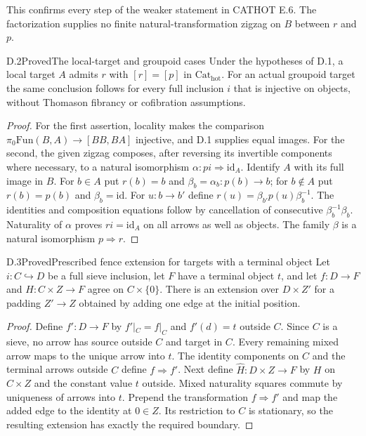 This confirms every step of the weaker statement in CATHOT E.6. The factorization supplies no finite natural-transformation zigzag on $B$ between $r$ and $p$.

\begin{claim}{D.2}{Proved}{The local-target and groupoid cases}
Under the hypotheses of D.1, a local target $A$ admits $r$ with $[r]=[p]$ in $\mathrm{Cat}_{\mathrm{hot}}$. For an actual groupoid target the same conclusion follows for every full inclusion $i$ that is injective on objects, without Thomason fibrancy or cofibration assumptions.
\end{claim}
\begin{proof}
For the first assertion, locality makes the comparison
$\pi_0\mathrm{Fun}(B,A)\to[BB,BA]$ injective, and D.1 supplies equal images.
For the second, the given zigzag composes, after reversing its invertible components where necessary, to a natural isomorphism $\alpha:pi\Rightarrow\mathrm{id}_A$. Identify $A$ with its full image in $B$. For $b\in A$ put $r(b)=b$ and $\beta_b=\alpha_b:p(b)\to b$; for $b\notin A$ put $r(b)=p(b)$ and $\beta_b=\mathrm{id}$. For $u:b\to b'$ define
$r(u)=\beta_{b'}p(u)\beta_b^{-1}$.
The identities and composition equations follow by cancellation of consecutive $\beta_b^{-1}\beta_b$. Naturality of $\alpha$ proves $ri=\mathrm{id}_A$ on all arrows as well as objects. The family $\beta$ is a natural isomorphism $p\Rightarrow r$.
\end{proof}

\begin{claim}{D.3}{Proved}{Prescribed fence extension for targets with a terminal object}
Let $i:C\hookrightarrow D$ be a full sieve inclusion, let $F$ have a terminal object $t$, and let $f:D\to F$ and $H:C\times Z\to F$ agree on $C\times\{0\}$. There is an extension over $D\times Z'$ for a padding $Z'\to Z$ obtained by adding one edge at the initial position.
\end{claim}
\begin{proof}
Define $f':D\to F$ by $f'|_C=f|_C$ and $f'(d)=t$ outside $C$. Since $C$ is a sieve, no arrow has source outside $C$ and target in $C$. Every remaining mixed arrow maps to the unique arrow into $t$. The identity components on $C$ and the terminal arrows outside $C$ define $f\Rightarrow f'$. Next define $\widehat H:D\times Z\to F$ by $H$ on $C\times Z$ and the constant value $t$ outside. Mixed naturality squares commute by uniqueness of arrows into $t$. Prepend the transformation $f\Rightarrow f'$ and map the added edge to the identity at $0\in Z$. Its restriction to $C$ is stationary, so the resulting extension has exactly the required boundary.
\end{proof}

